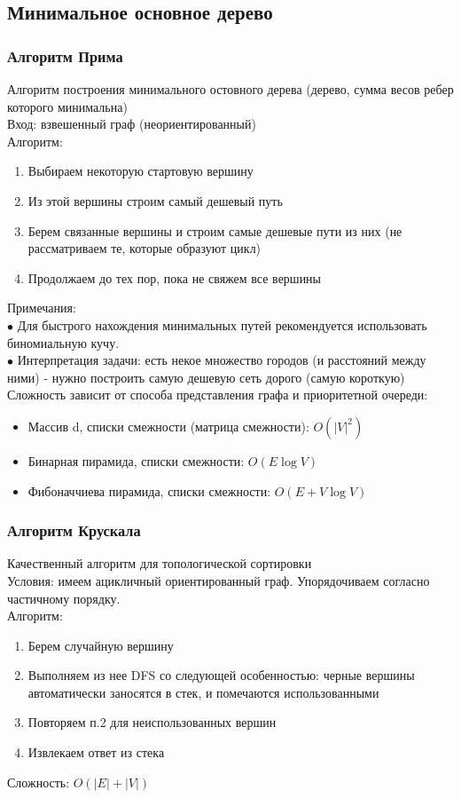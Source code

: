 \documentclass[a4paper]{article}
\begin{document}
\subsection{Минимальное основное дерево}
\subsubsection{Алгоритм Прима}
Алгоритм построения минимального остовного дерева (дерево, сумма весов ребер которого минимальна) \\
Вход: взвешенный граф (неориентированный) \\
Алгоритм:
\begin{enumerate}
	\item Выбираем некоторую стартовую вершину
	\item Из этой вершины строим самый дешевый путь
	\item Берем связанные вершины и строим самые дешевые пути из них (не рассматриваем те, которые образуют цикл)
	\item Продолжаем до тех пор, пока не свяжем все вершины
\end{enumerate}
Примечания: \\
$\bullet$ Для быстрого нахождения минимальных путей рекомендуется использовать биномиальную кучу. \\
$\bullet$ Интерпретация задачи: есть некое множество городов (и расстояний между ними) - нужно построить самую дешевую сеть дорого (самую короткую) \\
Сложность зависит от способа представления графа и приоритетной очереди:
\begin{itemize}
	\item Массив d, списки смежности (матрица смежности): $O(|V|^2)$
	\item Бинарная пирамида, списки смежности: $O(E \log V)$
	\item Фибоначчиева пирамида, списки смежности: $O(E + V \log V)$
\end{itemize}
\subsubsection{Алгоритм Крускала}
Качественный алгоритм для топологической сортировки \\
Условия: имеем ацикличный ориентированный граф. Упорядочиваем согласно частичному порядку. \\
Алгоритм:
\begin{enumerate}
	\item Берем случайную вершину
	\item Выполняем из нее DFS со следующей особенностью: черные вершины автоматически заносятся в стек, и помечаются использованными
	\item Повторяем п.2 для неиспользованных вершин
	\item Извлекаем ответ из стека
\end{enumerate} 
Сложность: $O(|E| + |V|)$
\end{document}
